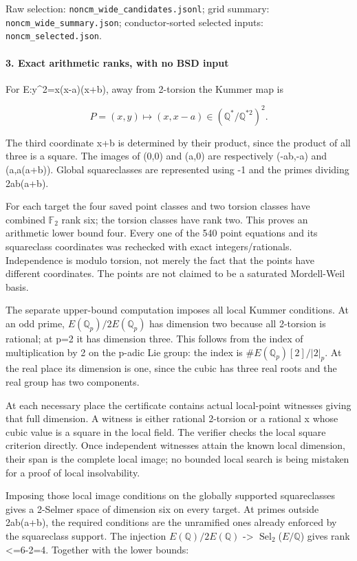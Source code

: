 \documentclass[11pt]{article}
\begin{document}
Raw selection: \nolinkurl{noncm_wide_candidates.jsonl}; grid summary: \nolinkurl{noncm_wide_summary.json}; conductor-sorted selected inputs: \nolinkurl{noncm_selected.json}.

\paragraph{3. Exact arithmetic ranks, with no BSD input}

For E:y\^{}2=x(x-a)(x+b), away from 2-torsion the Kummer map is

\[
P=(x,y)\longmapsto(x,x-a)\in(\mathbb Q^*/\mathbb Q^{*2})^2.
\]

The third coordinate x+b is determined by their product, since the product of all three is a square. The images of (0,0) and (a,0) are respectively (-ab,-a) and (a,a(a+b)). Global squareclasses are represented using -1 and the primes dividing 2ab(a+b).

For each target the four saved point classes and two torsion classes have combined \(\mathbb F_2\) rank six; the torsion classes have rank two. This proves an arithmetic lower bound four. Every one of the 540 point equations and its squareclass coordinates was rechecked with exact integers/rationals. Independence is modulo torsion, not merely the fact that the points have different coordinates. The points are not claimed to be a saturated Mordell-Weil basis.

The separate upper-bound computation imposes all local Kummer conditions. At an odd prime, \(E(\mathbb Q_p)/2E(\mathbb Q_p)\) has dimension two because all 2-torsion is rational; at p=2 it has dimension three. This follows from the index of multiplication by 2 on the p-adic Lie group: the index is \(\#E(\mathbb Q_p)[2]/|2|_p\). At the real place its dimension is one, since the cubic has three real roots and the real group has two components.

At each necessary place the certificate contains actual local-point witnesses giving that full dimension. A witness is either rational 2-torsion or a rational x whose cubic value is a square in the local field. The verifier checks the local square criterion directly. Once independent witnesses attain the known local dimension, their span is the complete local image; no bounded local search is being mistaken for a proof of local insolvability.

Imposing those local image conditions on the globally supported squareclasses gives a 2-Selmer space of dimension six on every target. At primes outside 2ab(a+b), the required conditions are the unramified ones already enforced by the squareclass support. The injection \(E(\mathbb Q)/2E(\mathbb Q)\) -\textgreater{} \(\operatorname{Sel}_2\)(\(E/\mathbb Q\)) gives rank \textless=6-2=4. Together with the lower bounds:
\end{document}
